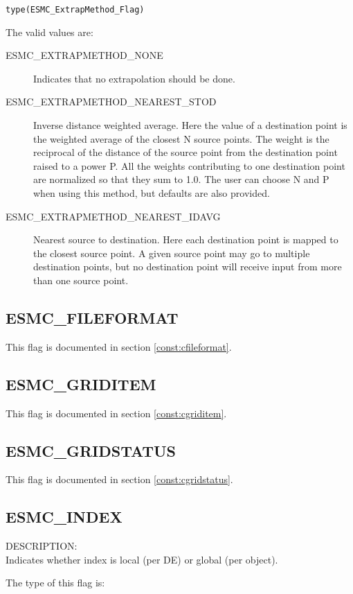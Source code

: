 {\tt type(ESMC\_ExtrapMethod\_Flag)}

The valid values are:
\begin{description}
\item [ESMC\_EXTRAPMETHOD\_NONE]
      Indicates that no extrapolation should be done. 
\item [ESMC\_EXTRAPMETHOD\_NEAREST\_STOD]
      Inverse distance weighted average. 
      Here the value of a destination point is the weighted average of the 
      closest N source points. The weight is the reciprocal of the distance of 
      the source point from the destination point raised to a power P. All the
      weights contributing to one destination point are normalized so that they 
      sum to 1.0. The user can choose N and P when using this method, but 
      defaults are also provided.  
\item [ESMC\_EXTRAPMETHOD\_NEAREST\_IDAVG]
      Nearest source to destination. 
      Here each destination point is mapped to the closest source point. A given 
      source point may go to multiple destination points, but no destination 
      point will receive input from more than one source point. 
\end{description}

\subsection{ESMC\_FILEFORMAT}
This flag is documented in section \ref{const:cfileformat}.

\subsection{ESMC\_GRIDITEM}
This flag is documented in section \ref{const:cgriditem}.

\subsection{ESMC\_GRIDSTATUS}
This flag is documented in section \ref{const:cgridstatus}.

\subsection{ESMC\_INDEX}
\label{const:indexflag}

{\sf DESCRIPTION:\\}
Indicates whether index is local (per DE) or global (per object).

The type of this flag is:

